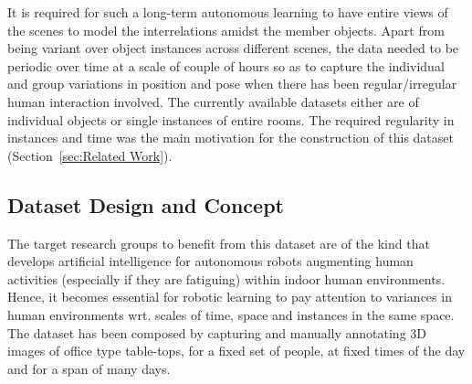 \documentclass[letterpaper, 10 pt, conference]{ieeeconf}  %
\begin{document}
It is required for such a long-term autonomous learning to have entire views of the scenes to model the interrelations amidst the member objects. Apart from being variant over object instances across different scenes, the data needed to be periodic over time at a scale of couple of hours so as to capture the individual and group variations in position and pose when there has been regular/irregular human interaction involved. The currently available datasets either are of individual objects or single instances of entire rooms. The required regularity in instances and time was the main motivation for the construction of this dataset (Section~\ref{sec:Related Work}).

\subsection{Dataset Design and Concept}
\label{ssec:Dataset Design and Concept}

The target research groups to benefit from this dataset are of the kind that develops artificial intelligence for autonomous robots augmenting human activities (especially if they are fatiguing) within indoor human environments. Hence, it becomes essential for robotic learning to pay attention to variances in human environments wrt. scales of time, space and instances in the same space. The dataset has been composed by capturing and manually annotating 3D images of office type table-tops, for a fixed set of people, at fixed times of the day and for a span of many days.
\end{document}
